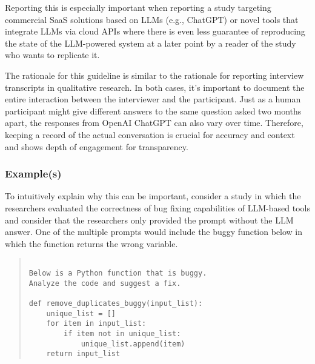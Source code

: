 Reporting this is especially important when reporting a study targeting commercial SaaS solutions based on LLMs (e.g., ChatGPT) or novel tools that integrate LLMs via cloud APIs where there is even less guarantee of reproducing the state of the LLM-powered system at a later point by a reader of the study who wants to replicate it. 



The rationale for this guideline is similar to the rationale for reporting interview transcripts in qualitative research. In both cases, it's important to document the entire interaction between the interviewer and the participant. Just as a human participant might give different answers to the same question asked two months apart, the responses from OpenAI ChatGPT can also vary over time. Therefore, keeping a record of the actual conversation is crucial for accuracy and context and shows depth of engagement for transparency.



\subsubsection{Example(s)}

To intuitively explain why this can be important, consider a study in which the researchers evaluated the correctness of bug fixing capabilities of LLM-based tools and consider that the researchers only provided the prompt without the LLM answer. One of the multiple prompts would include the buggy function below in which the function returns the wrong variable. 

\begin{quote}
\begin{verbatim}

Below is a Python function that is buggy. 
Analyze the code and suggest a fix.

def remove_duplicates_buggy(input_list):
    unique_list = []
    for item in input_list:
        if item not in unique_list:
            unique_list.append(item)
    return input_list 

\end{verbatim}
\end{quote}

